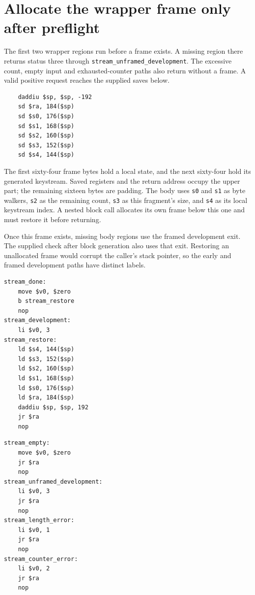 \section{Allocate the wrapper frame only after preflight}
The first two wrapper regions run before a frame exists. A missing region there
returns status three through \texttt{stream\_unframed\_development}. The excessive
count, empty input and exhausted-counter paths also return without a frame. A
valid positive request reaches the supplied saves below.

\begin{verbatim}
    daddiu $sp, $sp, -192
    sd $ra, 184($sp)
    sd $s0, 176($sp)
    sd $s1, 168($sp)
    sd $s2, 160($sp)
    sd $s3, 152($sp)
    sd $s4, 144($sp)
\end{verbatim}

The first sixty-four frame bytes hold a local state, and the next sixty-four hold
its generated keystream. Saved registers and the return address occupy the upper
part; the remaining sixteen bytes are padding. The body uses \texttt{s0} and
\texttt{s1} as byte walkers, \texttt{s2} as the remaining count, \texttt{s3} as this
fragment's size, and \texttt{s4} as its local keystream index. A nested block call
allocates its own frame below this one and must restore it before returning.

Once this frame exists, missing body regions use the framed development exit.
The supplied check after block generation also uses that exit. Restoring an
unallocated frame would corrupt the caller's stack pointer, so the early and
framed development paths have distinct labels.

\begin{verbatim}
stream_done:
    move $v0, $zero
    b stream_restore
    nop
stream_development:
    li $v0, 3
stream_restore:
    ld $s4, 144($sp)
    ld $s3, 152($sp)
    ld $s2, 160($sp)
    ld $s1, 168($sp)
    ld $s0, 176($sp)
    ld $ra, 184($sp)
    daddiu $sp, $sp, 192
    jr $ra
    nop
\end{verbatim}
\begin{verbatim}
stream_empty:
    move $v0, $zero
    jr $ra
    nop
stream_unframed_development:
    li $v0, 3
    jr $ra
    nop
stream_length_error:
    li $v0, 1
    jr $ra
    nop
stream_counter_error:
    li $v0, 2
    jr $ra
    nop
\end{verbatim}
